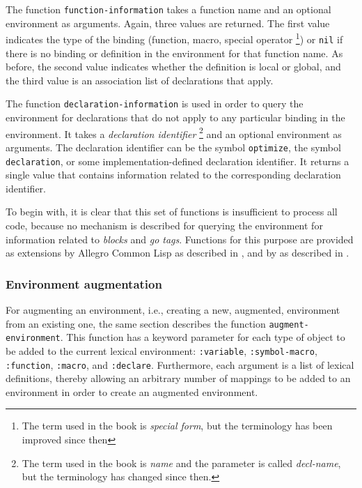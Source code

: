 The function \texttt{function-information} takes a function name and
an optional environment as arguments.  Again, three values are
returned.  The first value indicates the type of the binding
(function, macro, special operator%
\footnote{The term used in the book is \emph{special form}, but the
  terminology has been improved since then}) or \texttt{nil} if there
is no binding or definition in the environment for that function name.
As before, the second value indicates whether the definition is local
or global, and the third value is an association list of declarations
that apply.

The function \texttt{declaration-information} is used in order to
query the environment for declarations that do not apply to any
particular binding in the environment.  It takes a \emph{declaration
  identifier}%
\footnote{The term used in the book is \emph{name} and the parameter
  is called \textit{decl-name}, but the terminology has changed since
  then.} 
and an optional environment as arguments.  The declaration identifier
can be the symbol \texttt{optimize}, the symbol \texttt{declaration},
or some implementation-defined declaration identifier.  It returns a
single value that contains information related to the corresponding
declaration identifier.

To begin with, it is clear that this set of functions is insufficient
to process all \commonlisp{} code, because no mechanism is described
for querying the environment for information related to \emph{blocks}
and \emph{go tags}.  Functions for this purpose are provided as
extensions by Allegro Common Lisp as described in
, and by \lispworks{} as described in
.

\subsubsection{Environment augmentation}

For augmenting an environment, i.e., creating a new, augmented,
environment from an existing one, the same section describes the
function \texttt{augment-environment}.  This function has a keyword
parameter for each type of object to be added to the current lexical
environment: \texttt{:variable}, \texttt{:symbol-macro},
\texttt{:function}, \texttt{:macro}, and \texttt{:declare}.
Furthermore, each argument is a list of lexical definitions, thereby
allowing an arbitrary number of mappings to be added to an environment
in order to create an augmented environment.

